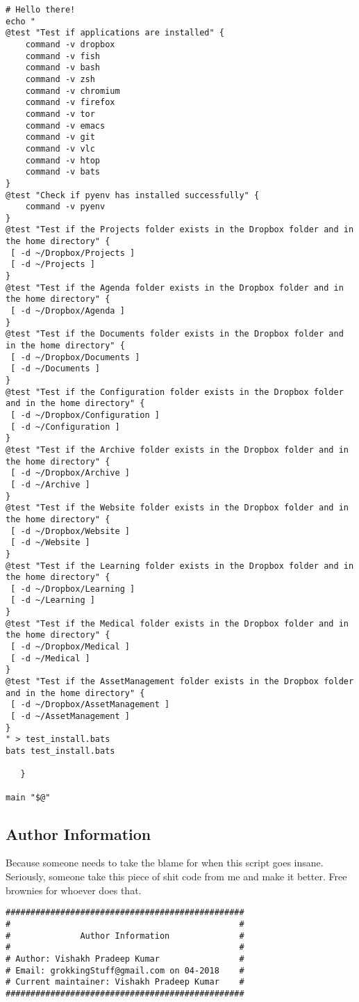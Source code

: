 \documentclass[11pt]{article}
\begin{document}
\begin{verbatim}
# Hello there!
echo "
@test "Test if applications are installed" {
    command -v dropbox
    command -v fish
    command -v bash
    command -v zsh
    command -v chromium
    command -v firefox
    command -v tor
    command -v emacs
    command -v git
    command -v vlc
    command -v htop
    command -v bats
}
@test "Check if pyenv has installed successfully" {
    command -v pyenv
}
@test "Test if the Projects folder exists in the Dropbox folder and in the home directory" {
 [ -d ~/Dropbox/Projects ]
 [ -d ~/Projects ]
}
@test "Test if the Agenda folder exists in the Dropbox folder and in the home directory" {
 [ -d ~/Dropbox/Agenda ]
}
@test "Test if the Documents folder exists in the Dropbox folder and in the home directory" {
 [ -d ~/Dropbox/Documents ]
 [ -d ~/Documents ]
}
@test "Test if the Configuration folder exists in the Dropbox folder and in the home directory" {
 [ -d ~/Dropbox/Configuration ]
 [ -d ~/Configuration ]
}
@test "Test if the Archive folder exists in the Dropbox folder and in the home directory" {
 [ -d ~/Dropbox/Archive ]
 [ -d ~/Archive ]
}
@test "Test if the Website folder exists in the Dropbox folder and in the home directory" {
 [ -d ~/Dropbox/Website ]
 [ -d ~/Website ]
}
@test "Test if the Learning folder exists in the Dropbox folder and in the home directory" {
 [ -d ~/Dropbox/Learning ]
 [ -d ~/Learning ]
}
@test "Test if the Medical folder exists in the Dropbox folder and in the home directory" {
 [ -d ~/Dropbox/Medical ]
 [ -d ~/Medical ]
}
@test "Test if the AssetManagement folder exists in the Dropbox folder and in the home directory" {
 [ -d ~/Dropbox/AssetManagement ]
 [ -d ~/AssetManagement ]
}
" > test_install.bats
bats test_install.bats

   }

main "$@"
\end{verbatim}

\subsection{Author Information}
\label{sec:org7ca383b}
Because someone needs to take the blame for when this script goes insane.
Seriously, someone take this piece of shit code from me and make it better.
Free brownies for whoever does that.

\begin{verbatim}
################################################
#                                              #
#              Author Information              #
#                                              #
# Author: Vishakh Pradeep Kumar                #
# Email: grokkingStuff@gmail.com on 04-2018    #
# Current maintainer: Vishakh Pradeep Kumar    #
################################################
\end{verbatim}
\end{document}

